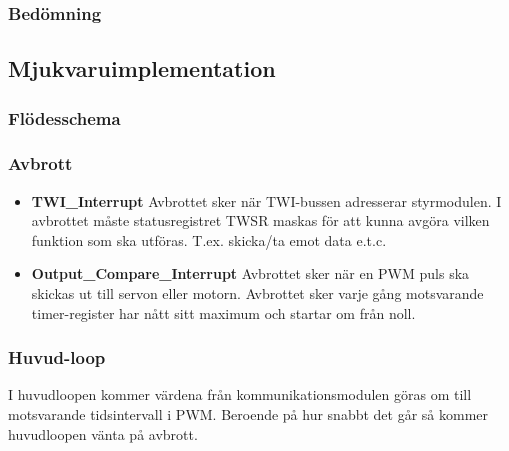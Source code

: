 \documentclass[designspec/spec.tex]{subfiles}
\begin{document}
\subsubsection{Bedömning}

\subsection{Mjukvaruimplementation}

\subsubsection{Flödesschema}

\subsubsection{Avbrott}

\begin{itemize}
	\item \textbf{TWI\_Interrupt} Avbrottet sker när TWI-bussen adresserar
	styrmodulen. I avbrottet måste statusregistret TWSR maskas för att kunna
	avgöra vilken funktion som ska utföras. T.ex. skicka/ta emot data e.t.c. 

	\item \textbf{Output\_Compare\_Interrupt} Avbrottet sker när en PWM puls
	ska skickas ut till servon eller motorn. Avbrottet sker varje gång
	motsvarande timer-register har nått sitt maximum och startar om från noll.
\end{itemize}

\subsubsection{Huvud-loop}
I huvudloopen kommer värdena från kommunikationsmodulen göras om till
motsvarande tidsintervall i PWM. Beroende på hur snabbt det går så kommer
huvudloopen vänta på avbrott.
\end{document}
